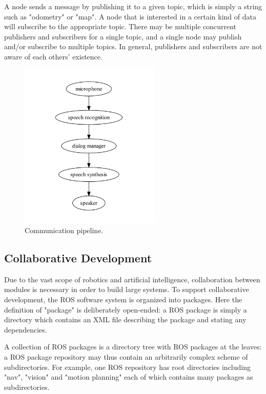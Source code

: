 A node sends a message by publishing it to a given topic, which is simply a string such as "odometry" or "map". A node that is interested in a certain kind of data will subscribe to the appropriate topic. There may be multiple concurrent publishers and subscribers for a single topic, and a single node may publish and/or subscribe to multiple topics. In general, publishers and subscribers are not aware of each others' existence.

\begin{figure}[h]
\centering
\includegraphics[width=0.6\textwidth]{figs/ch2/ros-pipeline}
\caption{Communication pipeline.}
\end{figure}

\subsection{Collaborative Development}

Due to the vast scope of robotics and artificial intelligence, collaboration between modules is necessary in order to build large systems. To support collaborative development, the ROS software system is organized into packages. Here the definition of "package" is deliberately open-ended: a ROS package is simply a directory which contains an XML file describing the package and stating any dependencies.

A collection of ROS packages is a directory tree with ROS packages at the leaves: a ROS package repository may thus contain an arbitrarily complex scheme of subdirectories. For example, one ROS repository has root directories including "nav", "vision" and "motion planning" each of which contains many packages as subdirectories.


